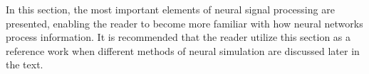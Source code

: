 	In this section, the most important elements of neural signal processing are presented, enabling the reader to become more familiar with how neural networks process information.
	It is recommended that the reader utilize this section as a reference work when different methods of neural simulation are discussed later in the text. %




	



	





		
	
